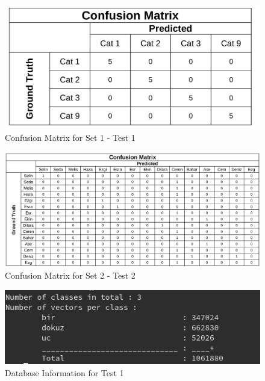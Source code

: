 \begin{figure}
    \centering
    \includegraphics[width=\linewidth]{content/040_image_processing/identification/img/confusionMatrix1.png}
    \caption{Confusion Matrix for Set 1 - Test 1}
    \label{fig:confusion1}
\end{figure}

\begin{figure}
    \centering
    \includegraphics[width=\linewidth]{content/040_image_processing/identification/img/confusionMatrix2.png}
    \caption{Confusion Matrix for Set 2 - Test 2}
    \label{fig:confusion2}
\end{figure}

\begin{figure}
    \centering
    \includegraphics[width=\linewidth]{content/040_image_processing/identification/img/databaseTest2.png}
    \caption{Database Information for Test 1}
    \label{fig:databaseInfo1}
\end{figure}

